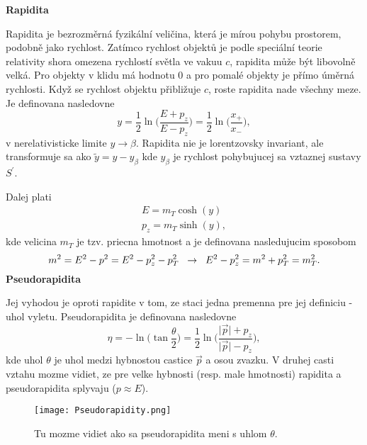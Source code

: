 \documentclass[../../main.tex]{subfiles}
\begin{document}
\textbf{Rapidita}\par
Rapidita je bezrozměrná fyzikální veličina, která je mírou pohybu prostorem, podobně jako rychlost. Zatímco rychlost objektů je podle speciální teorie relativity shora omezena rychlostí světla ve vakuu $c$, rapidita může být libovolně velká. Pro objekty v klidu má hodnotu 0 a pro pomalé objekty je přímo úměrná rychlosti. Když se rychlost objektu přibližuje $c$, roste rapidita nade všechny meze.
Je definovana nasledovne $$ y=\frac{1}{2}\ln\bigg( \frac{E+p_z}{E-p_z} \bigg)=\frac{1}{2}\ln\bigg( \frac{x_+}{x_-} \bigg), $$
v nerelativisticke limite $y\rightarrow \beta$. Rapidita nie je lorentzovsky invariant, ale transformuje sa ako $\tilde{y}=y-y_{\beta}$ kde $y_{\beta}$ je rychlost pohybujucej sa vztaznej sustavy $S^{\prime}$.\par
Dalej plati
\begin{equation}
\begin{gathered}
E=m_T\cosh(y) \\
p_z=m_T\sinh(y),
\end{gathered}
\end{equation}
kde velicina $m_T$ je tzv. priecna hmotnost a je definovana nasledujucim sposobom
$$ m^2=E^2-p^2=E^2-p_z^2-p_T^2 \hspace{0.2cm} \rightarrow \hspace{0.2cm} E^2-p^2_z=m^2+p^2_T=m^2_T. $$\newline
\newpage
\textbf{Pseudorapidita}\par
Jej vyhodou je oproti rapidite v tom, ze staci jedna premenna pre jej definiciu - uhol vyletu. Pseudorapidita je definovana nasledovne
$$ \eta=-\ln\bigg( \tan\frac{\theta}{2}  \bigg) = \frac{1}{2}\ln \bigg( \frac{\lvert \vec{p} \rvert+p_z}{\lvert \vec{p} \rvert-p_z} \bigg), $$
kde uhol $\theta$ je uhol medzi hybnostou castice $\vec{p}$ a osou zvazku. V druhej casti vztahu mozme vidiet, ze pre velke hybnosti (resp. male hmotnosti) rapidita a pseudorapidita splyvaju ($p\approx E$).
\begin{figure}[!h]
\centering
\texttt{[image: Pseudorapidity.png]}
\caption{Tu mozme vidiet ako sa pseudorapidita meni s uhlom $\theta$.}
\label{sf1:fig:Pseudorapidity}
\end{figure}
\newline
\end{document}
